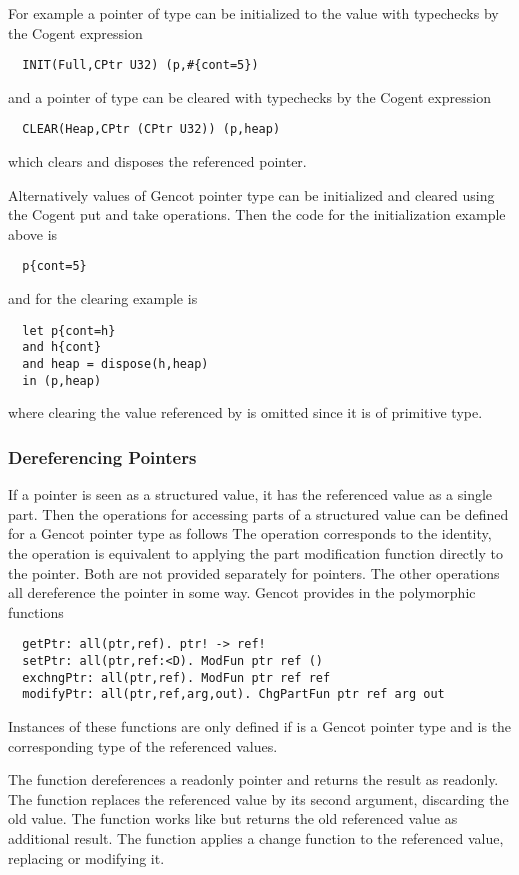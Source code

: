 For example a pointer  of type  can be initialized to the value  with typechecks by the 
Cogent expression
\begin{verbatim}
  INIT(Full,CPtr U32) (p,#{cont=5})
\end{verbatim}
and a pointer  of type  can be cleared with typechecks by the Cogent expression
\begin{verbatim}
  CLEAR(Heap,CPtr (CPtr U32)) (p,heap)
\end{verbatim}
which clears and disposes the referenced pointer.

Alternatively values of Gencot pointer type can be initialized and cleared using the Cogent put and take
operations. Then the code for the initialization example above is
\begin{verbatim}
  p{cont=5}
\end{verbatim}
and for the clearing example is
\begin{verbatim}
  let p{cont=h}
  and h{cont}
  and heap = dispose(h,heap)
  in (p,heap)
\end{verbatim}
where clearing the value referenced by  is omitted since it is of primitive type.

\subsubsection{Dereferencing Pointers}

If a pointer is seen as a structured value, it has the referenced value as a single part.
Then the operations for accessing parts of a structured value can be defined for a Gencot pointer type as follows
The operation  corresponds to the identity, the operation  is equivalent to applying the
part modification function directly to the pointer. Both are not provided separately for pointers.
The other operations all dereference the pointer in some way. Gencot provides in  
the polymorphic functions
\begin{verbatim}
  getPtr: all(ptr,ref). ptr! -> ref! 
  setPtr: all(ptr,ref:<D). ModFun ptr ref ()
  exchngPtr: all(ptr,ref). ModFun ptr ref ref
  modifyPtr: all(ptr,ref,arg,out). ChgPartFun ptr ref arg out
\end{verbatim}
Instances of these functions are only defined if  is a Gencot pointer type and  is the corresponding
type of the referenced values. 

The function  dereferences a readonly pointer and returns the result as readonly. The function 
replaces the referenced value by its second argument, discarding the old value. The function  works like 
 but returns the old referenced value as additional result. The function  applies a change
function to the referenced value, replacing or modifying it.

